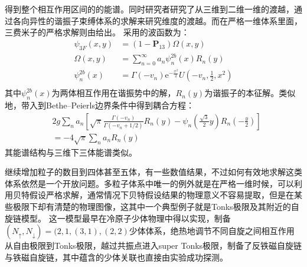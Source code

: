 得到整个相互作用区间的的能谱。同时研究者研究了从三维到二维一维的渡越\cite{blume2012}，通过各向异性的谐振子束缚体系的求解来研究维度的渡越。而在严格一维体系里面，三费米子的严格求解则由\cite{Rittenhouse2010green,d2014three,loft2015variational,andersen2016interpolatory,bellotti2017comparing}给出。
采用的波函数为：
\begin{equation}
\begin{split}
\psi_{3 F}(x, y)&=\left(1-\boldsymbol{P}_{13}\right) \Omega(x, y)\\
\Omega(x, y)&=\sum_{n=0}^{\infty} a_{n} \psi_{n}^{2b}(x) R_{n}(y)\\
\psi_{n}^{2b}(x)&=\Gamma\left(-v_{n}\right) \mathrm{e}^{-\frac{x^{2}}{2}} U\left(-v_{n}, \frac{1}{2}, x^{2}\right)\\
\end{split}
\end{equation}
其中$\psi_{n}^{2b}(x)$为两体相互作用在谐振势中的解，$R_{n}(y)$为谐振子的本征解。类似地，带入到Bethe–Peierls边界条件中得到耦合方程：
\begin{equation}
\begin{aligned}
&2 g \sum_{n} a_{n}\left[\sqrt{\pi} \frac{\Gamma\left(-v_{n}\right)}{\Gamma\left(-v_{n}+1 / 2\right)} R_{n}(y)-\psi_{n}\left(\frac{\sqrt{3}}{2} y\right) R_{n}\left(-\frac{y}{2}\right)\right] \\
&=-4 \sqrt{\pi} \sum_{n} a_{n} R_{n}(y)
\end{aligned}
\end{equation}
其能谱结构与三维下三体能谱类似。

\begin{comment}
相应地能谱如图~\ref{1d3b}~所示。
\begin{figure}[!htbp]
    \centering
    \texttt{[image: chap11d3b.png]}
    \bicaption{一维下三费米子体系$\uparrow \downarrow \uparrow$的能谱。摘自\citep{d2014three} }{Spectrum of three fermion system($\uparrow\downarrow\uparrow$ in 1D. Reprinted from \citep{d2014three}}
    \label{1d3b}
\end{figure}
\end{comment}

继续增加粒子的数目到四体甚至五体，有一些数值结果\cite{Blume2010,blume2012few}，不过如何有效地求解这类体系依然是一个开放问题。多粒子体系中唯一的例外就是在严格一维时候，可以利用贝特假设严格求解，通常情况下贝特假设结果的物理意义不容易提取，但是在某些极限下却有清楚的物理图像，这其中一个典型例子就是Tonks极限及其附近的自旋链模型\cite{Guan2009exact,ma2009mathematical,Lewenstein2013spinchain,volosniev2014strongly,Busch013spinchain,CuiHo2014,Santos2014spinchain,Puhan2015spinchain,Yang2016effective}。
这一模型最早在冷原子少体物理中得以实现，制备$(N_\uparrow,N_\downarrow)=(2,1,(3,1),(2,2)$少体体系，绝热地调节不同自旋之间相互作用从自由极限到Tonks极限，越过共振点进入super Tonks极限，制备了反铁磁自旋链与铁磁自旋链，其中蕴含的少体关联也直接由实验成功探测\citep{MurmannSpinChain}。

